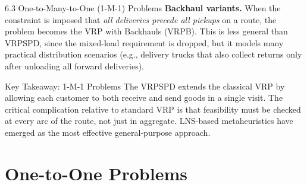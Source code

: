 \documentclass[aspectratio=169,10pt]{beamer}
\begin{document}
\begin{frame}[allowframebreaks]{6.3 One-to-Many-to-One (1-M-1) Problems}
  \textbf{Backhaul variants.}  When the constraint is imposed that \emph{all deliveries
  precede all pickups} on a route, the problem becomes the VRP with Backhauls (VRPB).
  This is less general than VRPSPD, since the mixed-load requirement is dropped, but
  it models many practical distribution scenarios (e.g., delivery trucks that also
  collect returns only after unloading all forward deliveries).

  \begin{alertblock}{Key Takeaway: 1-M-1 Problems}
    The VRPSPD extends the classical VRP by allowing each customer to both receive
    and send goods in a single visit. The critical complication relative to standard
    VRP is that feasibility must be checked at every arc of the route, not just
    in aggregate. LNS-based metaheuristics have emerged as the most effective
    general-purpose approach.
  \end{alertblock}

\end{frame}

\section{One-to-One Problems}
\end{document}

